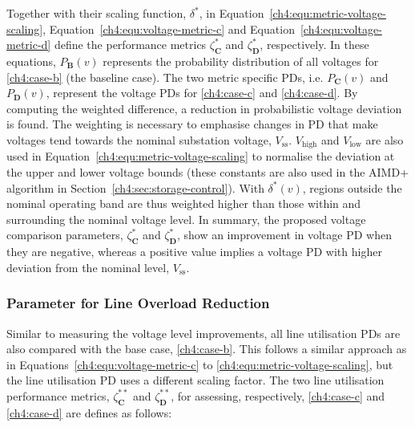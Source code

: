 Together with their scaling function, $\delta^{*}$, in Equation~\ref{ch4:equ:metric-voltage-scaling}, Equation~\ref{ch4:equ:voltage-metric-c} and Equation~\ref{ch4:equ:voltage-metric-d} define the performance metrics $\zeta_\textbf{C}^{*}$ and $\zeta_\textbf{D}^{*}$, respectively.
In these equations, $P_\textbf{B}(v)$ represents the probability distribution of all voltages for \ref{ch4:case-b} (the baseline case).
The two metric specific PDs, i.e. $P_\textbf{C}(v)$ and $P_\textbf{D}(v)$, represent the voltage PDs for \ref{ch4:case-c} and \ref{ch4:case-d}.
By computing the weighted difference, a reduction in probabilistic voltage deviation is found.
The weighting is necessary to emphasise changes in PD that make voltages tend towards the nominal substation voltage, $V_\text{ss}$.
$V_\text{high}$ and $V_\text{low}$ are also used in Equation~\ref{ch4:equ:metric-voltage-scaling} to normalise the deviation at the upper and lower voltage bounds (these constants are also used in the AIMD+ algorithm in Section~\ref{ch4:sec:storage-control}).
With $\delta^{*}(v)$, regions outside the nominal operating band are thus weighted higher than those within and surrounding the nominal voltage level.
In summary, the proposed voltage comparison parameters, $\zeta^*_\textbf{C}$ and $\zeta^*_\textbf{D}$, show an improvement in voltage PD when they are negative, whereas a positive value implies a voltage PD with higher deviation from the nominal level, $V_\text{ss}$.

\subsubsection{Parameter for Line Overload Reduction}

Similar to measuring the voltage level improvements, all line utilisation PDs are also compared with the base case, \ref{ch4:case-b}.
This follows a similar approach as in Equations~\ref{ch4:equ:voltage-metric-c} to \ref{ch4:equ:metric-voltage-scaling}, but the line utilisation PD uses a different scaling factor.
The two line utilisation performance metrics, $\zeta_\textbf{C}^{**}$ and $\zeta_\textbf{D}^{**}$, for assessing, respectively, \ref{ch4:case-c} and   \ref{ch4:case-d} are defines as follows:


